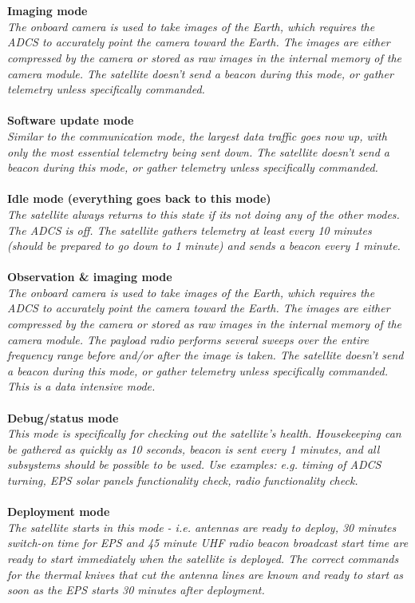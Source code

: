 \documentclass[english,12pt,a4paper,pdftex,elec,utf8]{aaltothesis}
\begin{document}
\\
\\
\textbf{Imaging mode}\\
\textit{The onboard camera is used to take images of the Earth, which requires the ADCS to accurately point the camera toward the Earth. The images are either compressed by the camera or stored as raw images in the internal memory of the camera module. The satellite doesn't send a beacon during this mode, or gather telemetry unless specifically commanded.}
\\
\\
\textbf{Software update mode}\\
\textit{Similar to the communication mode, the largest data traffic goes now up, with only the most essential telemetry being sent down. The satellite doesn't send a beacon during this mode, or gather telemetry unless specifically commanded.}
\\
\\
\textbf{Idle mode (everything goes back to this mode)}\\
\textit{The satellite always returns to this state if its not doing any of the other modes. The ADCS is off. The satellite gathers telemetry at least every 10 minutes (should be prepared to go down to 1 minute) and sends a beacon every 1 minute.}
\\
\\
\textbf{Observation \& imaging mode}\\
\textit{The onboard camera is used to take images of the Earth, which requires the ADCS to accurately point the camera toward the Earth. The images are either compressed by the camera or stored as raw images in the internal memory of the camera module. The payload radio performs several sweeps over the entire frequency range before and/or after the image is taken. The satellite doesn't send a beacon during this mode, or gather telemetry unless specifically commanded. This is a data intensive mode.}
\\
\\
\textbf{Debug/status mode}\\
\textit{This mode is specifically for checking out the satellite's health. Housekeeping can be gathered as quickly as 10 seconds, beacon is sent every 1 minutes, and all subsystems should be possible to be used. Use examples: e.g. timing of ADCS turning, EPS solar panels functionality check, radio functionality check.}
\\
\\
\textbf{Deployment mode}\\
\textit{The satellite starts in this mode - i.e. antennas are ready to deploy, 30 minutes switch-on time for EPS and 45 minute UHF radio beacon broadcast start time are ready to start immediately when the satellite is deployed. The correct commands for the thermal knives that cut the antenna lines are known and ready to start as soon as the EPS starts 30 minutes after deployment.}\par
\end{document}
